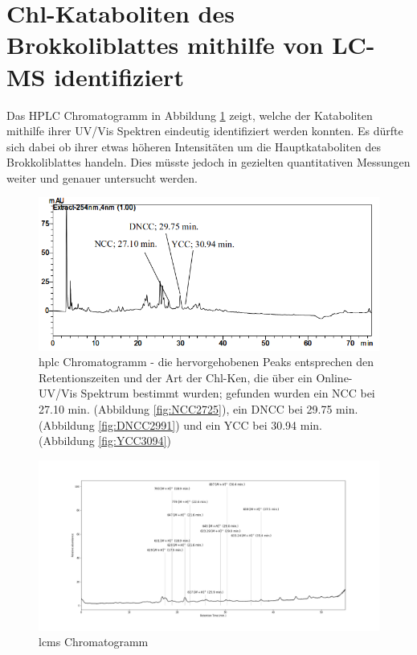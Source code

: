 \section{Chl-Kataboliten des Brokkoliblattes mithilfe von LC-MS identifiziert} \label{sec:ChlKatabolitenBrokkoli}

Das HPLC Chromatogramm in Abbildung \ref{fig:HPLCChromatogramm} zeigt, welche der Kataboliten mithilfe ihrer UV/Vis Spektren eindeutig identifiziert werden konnten. Es dürfte sich dabei ob ihrer etwas höheren Intensitäten um die Hauptkataboliten des Brokkoliblattes handeln. Dies müsste jedoch in gezielten quantitativen Messungen weiter und genauer untersucht werden.

\begin{figure}[!htbp]
  \includegraphics[width=\textwidth]{figures/Kapitel6/keineReaktion/VWA_HPLC_Chromatogramm_keineReaktion.png}
  \caption[HPLC Chromatogramm vor der Reaktion, Quelle: Autor]{\gls{hplc} Chromatogramm - die hervorgehobenen Peaks entsprechen den Retentionszeiten und der Art der \gls{Chl-K}en, die über ein Online-UV/Vis Spektrum bestimmt wurden; gefunden wurden ein \gls{NCC} bei 27.10 min. (Abbildung \ref{fig:NCC2725}), ein DNCC bei 29.75 min. (Abbildung \ref{fig:DNCC2991}) und ein YCC bei 30.94 min. (Abbildung \ref{fig:YCC3094})}
  \label{fig:HPLCChromatogramm}
\end{figure}

\begin{figure}[!htbp]
  \centering
  \includegraphics[width=1.4\textwidth, center]{figures/Kapitel6/keineReaktion/Kuerbis_Analyse_keineReaktion2_Ganzes_Spektrum.png}
  \caption[LC-MS Chromatogramm vor der Reaktion, Quelle: Autor]{\gls{lcms} Chromatogramm}
  \label{fig:LCMSChromatogramm}
\end{figure}


